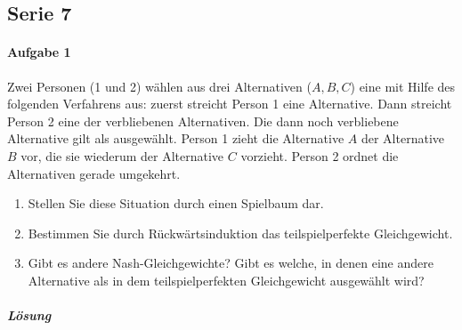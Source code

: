 \subsection{Serie 7}%
\label{sub:serie_7}

\paragraph{Aufgabe 1}%
\label{par:serie_7_aufgabe_1}

Zwei Personen (1 und 2) wählen aus drei Alternativen ($A, B, C$) eine mit Hilfe des
folgenden Verfahrens aus: zuerst streicht Person 1 eine Alternative.
Dann streicht Person 2 eine der verbliebenen Alternativen.
Die dann noch verbliebene Alternative gilt als ausgewählt.
Person 1 zieht die Alternative $A$ der Alternative $B$ vor, die sie wiederum der
Alternative $C$ vorzieht.
Person 2 ordnet die Alternativen gerade umgekehrt.

\begin{enumerate}
  \item Stellen Sie diese Situation durch einen Spielbaum dar.
  \item Bestimmen Sie durch Rückwärtsinduktion das teilspielperfekte Gleichgewicht.
  \item Gibt es andere Nash-Gleichgewichte?
    Gibt es welche, in denen eine andere Alternative als in dem teilspielperfekten
    Gleichgewicht ausgewählt wird?
\end{enumerate}

\subparagraph{Lösung}%


